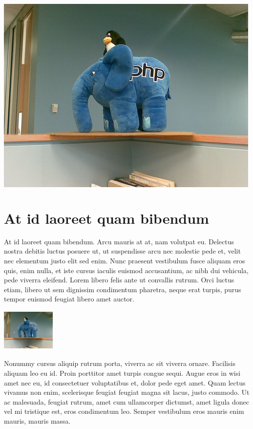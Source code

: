 \documentclass[12pt]{article}
\begin{document}
\includegraphics{php}

\section{At id laoreet quam bibendum}

At id laoreet quam bibendum. Arcu mauris at at, nam volutpat eu. Delectus nostra debitis luctus posuere ut, ut suspendisse arcu nec molestie pede et, velit nec elementum justo elit sed enim. Nunc praesent vestibulum fusce aliquam eros quis, enim nulla, et iste cursus iaculis euismod accusantium, ac nibh dui vehicula, pede viverra eleifend. Lorem libero felis ante ut convallis rutrum. Orci luctus etiam, libero ut sem dignissim condimentum pharetra, neque erat turpis, purus tempor euismod feugiat libero amet auctor. 

\includegraphics[width=100px, height=80px]{php}

Nonummy cursus aliquip rutrum porta, viverra ac sit viverra ornare. Facilisis aliquam leo eu id. Proin porttitor amet turpis congue sequi. Augue eros in wisi amet nec eu, id consectetuer voluptatibus et, dolor pede eget amet. Quam lectus vivamus non enim, scelerisque feugiat feugiat magna sit lacus, justo commodo. Ut ac malesuada, feugiat rutrum, amet cum ullamcorper dictumst, amet ligula donec vel mi tristique est, eros condimentum leo. Semper vestibulum eros mauris enim mauris, mauris massa. 
\end{document}
